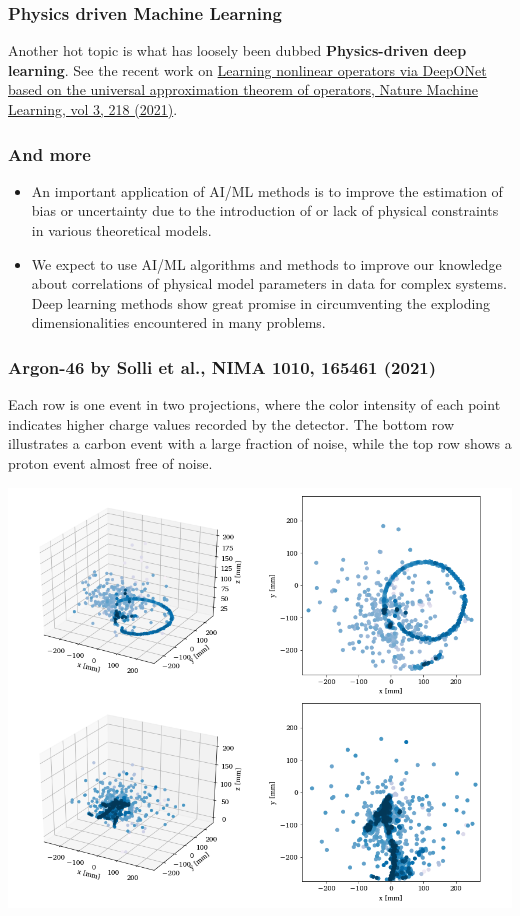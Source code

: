 \documentclass{beamer}
\begin{document}
\begin{frame}
\frametitle{Physics driven Machine Learning}

Another hot topic is what has loosely been dubbed \textbf{Physics-driven deep learning}. See the recent work on \href{{https://www.nature.com/articles/s42256-021-00302-5}}{Learning nonlinear operators via DeepONet based on the universal approximation theorem of operators, Nature Machine Learning, vol 3, 218 (2021)}.

\end{frame}

\begin{frame}
\frametitle{And more}

\begin{block}{}
\begin{itemize}
\item An important application of AI/ML methods is to improve the estimation of bias or uncertainty due to the introduction of or lack of physical constraints in various theoretical models.

\item We expect to use AI/ML algorithms and methods to improve our knowledge about  correlations of physical model parameters in data for complex systems. Deep learning methods show great promise in circumventing the exploding dimensionalities encountered in many problems.

\end{itemize}

\noindent
\end{block}
\end{frame}

\begin{frame}
\frametitle{Argon-46 by Solli et al., NIMA 1010, 165461 (2021)}

\begin{block}{}
Each row is one event in two projections,
where the color intensity of each point indicates higher charge values
recorded by the detector. The bottom row illustrates a carbon event with
a large fraction of noise, while the top row shows a proton event
almost free of noise. 
\end{block}

\centerline{\includegraphics[width=0.6\linewidth]{figures/examples_raw.png}}
\end{frame}
\end{document}
